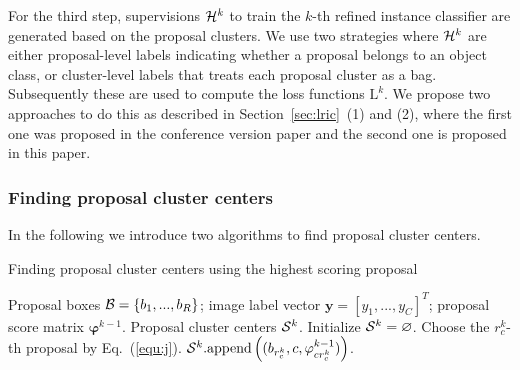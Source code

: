 \documentclass[10pt,journal,compsoc]{IEEEtran}
\begin{document}
For the third step,
supervisions ${\cal H}^{k}$ to train the $k$-th refined instance classifier are generated based on the proposal clusters.
We use two strategies where ${\cal H}^{k}$ are either proposal-level labels indicating whether a proposal belongs to an object class,
or cluster-level labels that treats each proposal cluster as a bag.
Subsequently these are used to compute the loss functions $\mathrm{L}^{k}$.
We propose two approaches to do this as described in Section~\ref{sec:lric}~(1) and (2),
where the first one was proposed in the conference version paper
and the second one is proposed in this paper.



\subsubsection{Finding proposal cluster centers}
\label{sec:fpcc}

In the following we introduce two algorithms to find proposal cluster centers. 

\begin{algorithm}[t]
\caption{Finding proposal cluster centers using the highest scoring proposal}
\label{alg:h}
\begin{algorithmic}[1]
   \REQUIRE Proposal boxes ${\cal B} = \{b_{1}, ..., b_{R}\}$; image label vector $\mathbf{y} = [y_{1}, ..., y_{C}]^{T}$; proposal score matrix $\bm{\varphi}^{k-1}$.
   \ENSURE Proposal cluster centers ${\cal S}^{k}$.
   \STATE Initialize ${\cal S}^{k} = \varnothing$.
         \STATE Choose the $r^{k}_{c}$-th proposal by Eq.~(\ref{equ:j}).
         \STATE ${\cal S}^{k}\textup{.append}\left((b_{r^{k}_{c}}, c, \varphi^{k-1}_{cr^{k}_{c}})\right)$.
      \ENDIF
   \ENDFOR
\end{algorithmic}
\end{algorithm}
\end{document}
